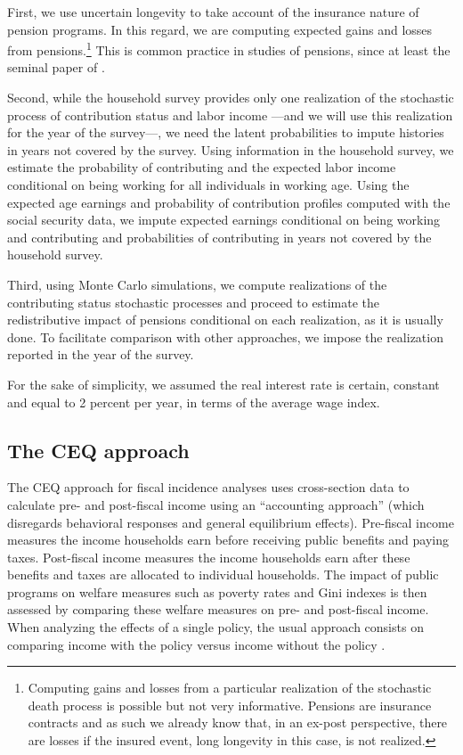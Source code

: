 \documentclass{article}
\begin{document}
First, we use uncertain longevity to take account of the insurance nature of pension programs. In this regard, we are computing expected gains and losses from pensions.\footnote{Computing gains and losses from a particular realization of the stochastic death process is possible but not very informative. Pensions are insurance contracts and as such we already know that, in an ex-post perspective, there are losses if the insured event, long longevity in this case, is not realized.} This is common practice in studies of pensions, since at least the seminal paper of \textcite{Feldstein1974a}. 

Second, while the household survey provides only one realization of the stochastic process of  contribution status and labor income ---and we will use this realization for the year of the survey---, we need the latent probabilities to impute histories in years not covered by the survey. Using information in the household survey, we estimate the probability of contributing and the expected labor income conditional on being working for all individuals in working age. Using the expected age earnings and probability of contribution profiles computed with the social security data, we impute expected earnings conditional on being working and contributing and probabilities of contributing in years not covered by the household survey.

 Third, using Monte Carlo simulations, we compute realizations of the contributing status stochastic processes and proceed to estimate the redistributive impact of pensions conditional on each realization, as it is usually done. To facilitate comparison with other approaches, we impose the realization reported in the year of the survey.

For the sake of simplicity, we assumed the real interest rate is certain, constant and equal to 2 percent per year, in terms of the average wage index. 

\subsection{The CEQ approach} \label{sec:method_CEQ}

The CEQ approach for fiscal incidence analyses uses cross-section data to calculate pre- and post-fiscal income using an ``accounting approach'' (which disregards behavioral responses and general equilibrium effects). Pre-fiscal income measures the income households earn before receiving public benefits and paying taxes. Post-fiscal income measures the income households earn after these benefits and taxes are allocated to individual households. The impact of public programs on welfare measures such as poverty rates and Gini indexes is then assessed by comparing these welfare measures on pre- and post-fiscal income. When analyzing the effects of a single policy, the usual approach consists on comparing income with the policy versus income without the policy \parencite{Lustig2022a, Lustig2022b}. 
\end{document}

